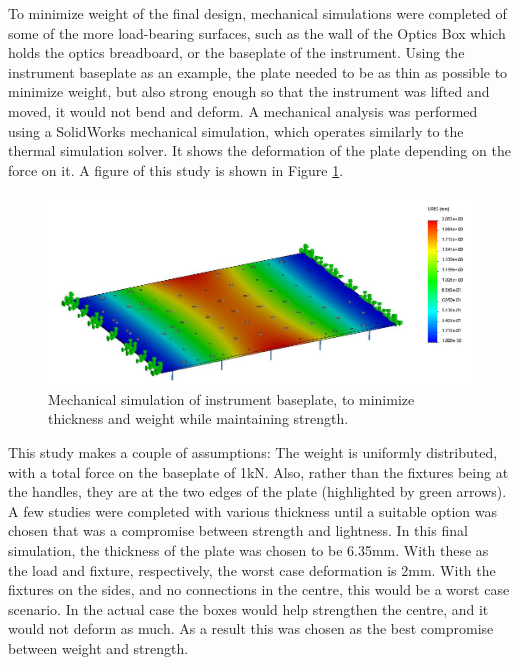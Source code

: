 To minimize weight of the final design, mechanical simulations were completed of some of the more load-bearing surfaces, such as the wall of the Optics Box which holds the optics breadboard, or the baseplate of the instrument. Using the instrument baseplate as an example, the plate needed to be as thin as possible to minimize weight, but also strong enough so that the instrument was lifted and moved, it would not bend and deform. A mechanical analysis was performed using a SolidWorks mechanical simulation, which operates similarly to the thermal simulation solver. It shows the deformation of the plate depending on the force on it. A figure of this study is shown in Figure \ref{fig:mech_sim}.

\begin{figure}
    \centering
    \includegraphics[width=\textwidth]{chap3_images/mech_deformation.JPG}
    \caption{Mechanical simulation of instrument baseplate, to minimize thickness and weight while maintaining strength.}
    \label{fig:mech_sim}
\end{figure}

This study makes a couple of assumptions: The weight is uniformly distributed, with a total force on the baseplate of 1kN. Also, rather than the fixtures being at the handles, they are at the two edges of the plate (highlighted by green arrows). A few studies were completed with various thickness until a suitable option was chosen that was a compromise between strength and lightness. In this final simulation, the thickness of the plate was chosen to be 6.35mm. With these as the load and fixture, respectively, the worst case deformation is 2mm. With the fixtures on the sides, and no connections in the centre, this would be a worst case scenario. In the actual case the boxes would help strengthen the centre, and it would not deform as much. As a result this was chosen as the best compromise between weight and strength.

